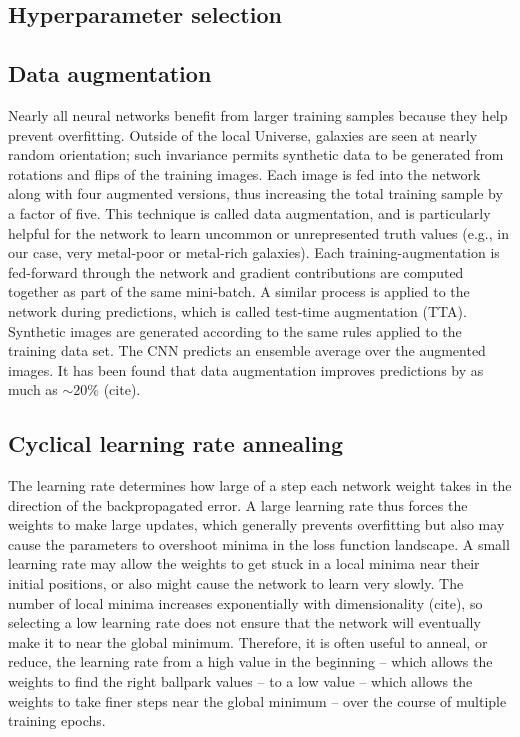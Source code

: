\documentclass[fleqn,usenatbib]{mnras}
\begin{document}
\subsection{Hyperparameter selection}

\subsection{Data augmentation}
Nearly all neural networks benefit from larger training samples because they help prevent overfitting.
Outside of the local Universe, galaxies are seen at nearly random orientation; such invariance permits synthetic data to be generated from rotations and flips of the training images.
Each image is fed into the network along with four augmented versions, thus increasing the total training sample by a factor of five.
This technique is called data augmentation, and is particularly helpful for the network to learn uncommon or unrepresented truth values (e.g., in our case, very metal-poor or metal-rich galaxies).
Each training-augmentation is fed-forward through the network and gradient contributions are computed together as part of the same mini-batch.
A similar process is applied to the network during predictions, which is called test-time augmentation (TTA).
Synthetic images are generated according to the same rules applied to the training data set. 
The CNN predicts an ensemble average over the augmented images.
It has been found that data augmentation improves predictions by as much as $\sim 20\%$ (cite).

\subsection{Cyclical learning rate annealing}
The learning rate determines how large of a step each network weight takes in the direction of the backpropagated error.
A large learning rate thus forces the weights to make large updates, which generally prevents overfitting but also may cause the parameters to overshoot minima in the loss function landscape.
A small learning rate may allow the weights to get stuck in a local minima near their initial positions, or also might cause the network to learn very slowly.
The number of local minima increases exponentially with dimensionality (cite), so selecting a low learning rate does not ensure that the network will eventually make it to near the global minimum.
Therefore, it is often useful to anneal, or reduce, the learning rate from a high value in the beginning -- which allows the weights to find the right ballpark values -- to a low value -- which allows the weights to take finer steps near the global minimum -- over the course of multiple training epochs.
\end{document}
